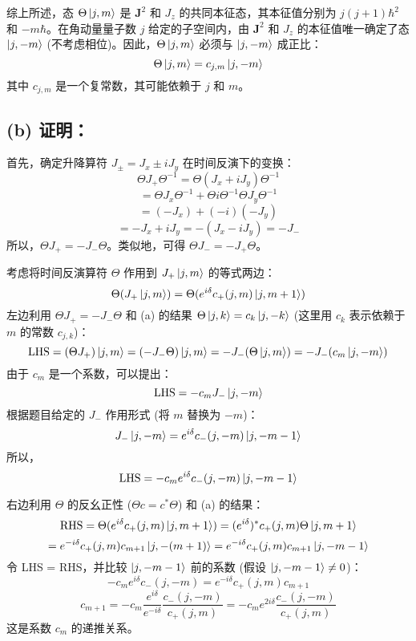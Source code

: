 \documentclass{article}
\begin{document}
综上所述，态 \(\Theta\ket{j, m}\) 是 \(\mathbf{J}^2\) 和 \(J_z\) 的共同本征态，其本征值分别为 \(j(j+1)\hbar^2\) 和 \(-m\hbar\)。在角动量量子数 \(j\) 给定的子空间内，由 \(\mathbf{J}^2\) 和 \(J_z\) 的本征值唯一确定了态 \(\ket{j, -m}\) (不考虑相位)。因此，\(\Theta\ket{j, m}\) 必须与 \(\ket{j, -m}\) 成正比：
\[ \Theta\ket{j, m} = c_{j,m}\ket{j, -m} \]
其中 \(c_{j,m}\) 是一个复常数，其可能依赖于 \(j\) 和 \(m\)。

\subsection*{(b) 证明：}
首先，确定升降算符 \(J_\pm = J_x \pm iJ_y\) 在时间反演下的变换：
\[ \Theta J_+ \Theta^{-1} = \Theta (J_x + iJ_y) \Theta^{-1} \]
\[ = \Theta J_x \Theta^{-1} + \Theta i \Theta^{-1} \Theta J_y \Theta^{-1} \]
\[ = (-J_x) + (-i) (-J_y) \]
\[ = -J_x + iJ_y = -(J_x - iJ_y) = -J_- \]
所以，\(\Theta J_+ = -J_- \Theta\)。类似地，可得 \(\Theta J_- = -J_+ \Theta\)。

考虑将时间反演算符 \(\Theta\) 作用到 \(J_+\ket{j, m}\) 的等式两边：
\[ \Theta (J_+\ket{j, m}) = \Theta (e^{i\delta} c_+(j, m) \ket{j, m+1}) \]
左边利用 \(\Theta J_+ = -J_- \Theta\) 和 (a) 的结果 \(\Theta\ket{j, k} = c_k\ket{j, -k}\) (这里用 \(c_k\) 表示依赖于 \(m\) 的常数 \(c_{j,k}\))：
\[ \text{LHS} = (\Theta J_+) \ket{j, m} = (-J_- \Theta) \ket{j, m} = -J_- (\Theta\ket{j, m}) = -J_- (c_m\ket{j, -m}) \]
由于 \(c_m\) 是一个系数，可以提出：
\[ \text{LHS} = -c_m J_-\ket{j, -m} \]
根据题目给定的 \(J_-\) 作用形式 (将 \(m\) 替换为 \(-m\))：
\[ J_-\ket{j, -m} = e^{i\delta} c_-(j, -m) \ket{j, -m-1} \]
所以，
\[ \text{LHS} = -c_m e^{i\delta} c_-(j, -m) \ket{j, -m-1} \]

右边利用 \(\Theta\) 的反幺正性 (\(\Theta c = c^* \Theta\)) 和 (a) 的结果：
\[ \text{RHS} = \Theta (e^{i\delta} c_+(j, m) \ket{j, m+1}) = (e^{i\delta})^* c_+(j, m) \Theta\ket{j, m+1} \]
\[ = e^{-i\delta} c_+(j, m) c_{m+1} \ket{j, -(m+1)} = e^{-i\delta} c_+(j, m) c_{m+1} \ket{j, -m-1} \]
令 LHS = RHS，并比较 \(\ket{j, -m-1}\) 前的系数 (假设 \(\ket{j, -m-1} \neq 0\))：
\[ -c_m e^{i\delta} c_-(j, -m) = e^{-i\delta} c_+(j, m) c_{m+1} \]
\[ c_{m+1} = -c_m \frac{e^{i\delta}}{e^{-i\delta}} \frac{c_-(j, -m)}{c_+(j, m)} = -c_m e^{2i\delta} \frac{c_-(j, -m)}{c_+(j, m)} \]
这是系数 \(c_m\) 的递推关系。
\end{document}
